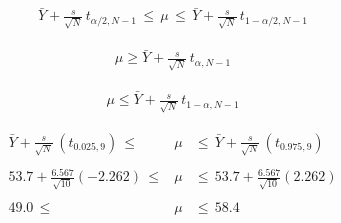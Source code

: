 \documentclass[12pt]{article}
\begin{document}
\pagestyle{empty}
\Large
{}
\pagecolor{ehandbook}

\boldmath
\begin{eqnarray*}
\bar{Y} + \frac{s}{\sqrt{N}} \,  t_{\alpha/2, N-1} \, \le \, \mu \, \le \, \bar{Y} + \frac{s}{\sqrt{N}} \,  t_{1-\alpha/2, N-1}
\end{eqnarray*}

\hspace*{.25in}

\begin{eqnarray*}
\mu \ge \bar{Y} + \frac{s}{\sqrt{N}} \,  t_{\alpha, N-1}
\end{eqnarray*}

\hspace*{.25in}

\begin{eqnarray*}
\mu \le \bar{Y} + \frac{s}{\sqrt{N}} \, t_{1-\alpha, N-1}
\end{eqnarray*}

\hspace*{.25in}

\begin{eqnarray*}
\bar{Y} + \frac{s}{\sqrt{N}} \,  (t_{0.025, 9}) \, \le & \mu & \le \, \bar{Y} + \frac{s}{\sqrt{N}} \,  (t_{0.975, 9}) \\
 & & \\
53.7 + \frac{6.567}{\sqrt{10}} (-2.262)   \, \le & \mu & \le \, 53.7 + \frac{6.567}{\sqrt{10}}(2.262) \\
 & & \\
49.0  \, \le & \mu & \le \, 58.4
\end{eqnarray*}
\end{document}

